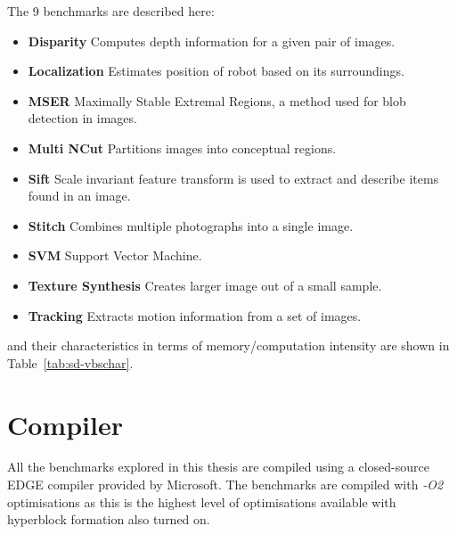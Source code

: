 The 9 benchmarks are described here:
\begin{itemize}
\item \textbf{Disparity} Computes depth information for a given pair of images.
\vspace{-1em}
\item \textbf{Localization} Estimates position of robot based on its surroundings.
\vspace{-1em}
\item \textbf{MSER} Maximally Stable Extremal Regions, a method used for blob detection in images.
\vspace{-1em}
\item \textbf{Multi NCut} Partitions images into conceptual regions.
\vspace{-1em}
\item \textbf{Sift} Scale invariant feature transform is used to extract and describe items found in an image.
\vspace{-1em}
\item \textbf{Stitch} Combines multiple photographs into a single image.
\vspace{-1em}
\item \textbf{SVM} Support Vector Machine.
\vspace{-1em}
\item \textbf{Texture Synthesis} Creates larger image out of a small sample.
\vspace{-1em}
\item \textbf{Tracking} Extracts motion information from a set of images.
\end{itemize}

and their characteristics in terms of memory/computation intensity are shown in Table~\ref{tab:sd-vbschar}.
\section{Compiler}\label{chp:setup:comp}

All the benchmarks explored in this thesis are compiled using a closed-source EDGE compiler provided by Microsoft.
The benchmarks are compiled with \textit{-O2} optimisations as this is the highest level of optimisations available with hyperblock formation also turned on.
